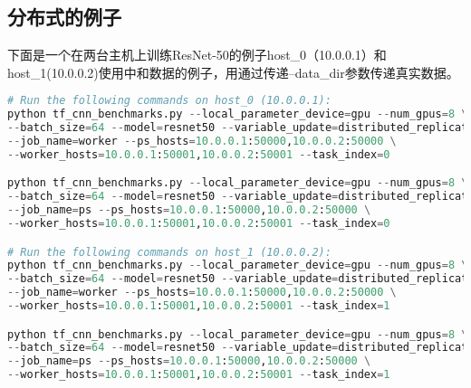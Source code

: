 \subsection{分布式的例子}
下面是一个在两台主机上训练ResNet-50的例子host\_0（10.0.0.1）和host\_1(10.0.0.2)使用中和数据的例子，用通过传递--data\_dir参数传递真实数据。
\begin{lstlisting}[language=Python]
# Run the following commands on host_0 (10.0.0.1):
python tf_cnn_benchmarks.py --local_parameter_device=gpu --num_gpus=8 \
--batch_size=64 --model=resnet50 --variable_update=distributed_replicated \
--job_name=worker --ps_hosts=10.0.0.1:50000,10.0.0.2:50000 \
--worker_hosts=10.0.0.1:50001,10.0.0.2:50001 --task_index=0

python tf_cnn_benchmarks.py --local_parameter_device=gpu --num_gpus=8 \
--batch_size=64 --model=resnet50 --variable_update=distributed_replicated \
--job_name=ps --ps_hosts=10.0.0.1:50000,10.0.0.2:50000 \
--worker_hosts=10.0.0.1:50001,10.0.0.2:50001 --task_index=0

# Run the following commands on host_1 (10.0.0.2):
python tf_cnn_benchmarks.py --local_parameter_device=gpu --num_gpus=8 \
--batch_size=64 --model=resnet50 --variable_update=distributed_replicated \
--job_name=worker --ps_hosts=10.0.0.1:50000,10.0.0.2:50000 \
--worker_hosts=10.0.0.1:50001,10.0.0.2:50001 --task_index=1

python tf_cnn_benchmarks.py --local_parameter_device=gpu --num_gpus=8 \
--batch_size=64 --model=resnet50 --variable_update=distributed_replicated \
--job_name=ps --ps_hosts=10.0.0.1:50000,10.0.0.2:50000 \
--worker_hosts=10.0.0.1:50001,10.0.0.2:50001 --task_index=1
\end{lstlisting}














